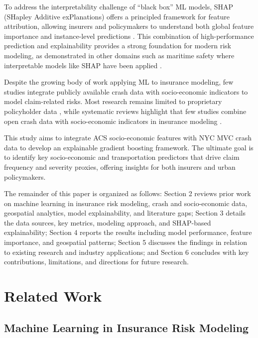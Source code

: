 \documentclass[
  number,
  review,
  3p]{elsarticle}
\begin{document}
To address the interpretability challenge of ``black box'' ML models,
SHAP (SHapley Additive exPlanations) offers a principled framework for
feature attribution, allowing insurers and policymakers to understand
both global feature importance and instance-level predictions
\citep{lundberg, dong, ning}. This combination of high-performance
prediction and explainability provides a strong foundation for modern
risk modeling, as demonstrated in other domains such as maritime safety
where interpretable models like SHAP have been applied \citep{kim}.

Despite the growing body of work applying ML to insurance modeling, few
studies integrate publicly available crash data with socio-economic
indicators to model claim-related risks. Most research remains limited
to proprietary policyholder data \citep{henckaerts, mohamed}, while
systematic reviews highlight that few studies combine open crash data
with socio-economic indicators in insurance modeling
\citep{ali, behboudi}.

This study aims to integrate ACS socio-economic features with NYC MVC
crash data to develop an explainable gradient boosting framework. The
ultimate goal is to identify key socio-economic and transportation
predictors that drive claim frequency and severity proxies, offering
insights for both insurers and urban policymakers.

The remainder of this paper is organized as follows: Section 2 reviews
prior work on machine learning in insurance risk modeling, crash and
socio-economic data, geospatial analytics, model explainability, and
literature gaps; Section 3 details the data sources, key metrics,
modeling approach, and SHAP-based explainability; Section 4 reports the
results including model performance, feature importance, and geospatial
patterns; Section 5 discusses the findings in relation to existing
research and industry applications; and Section 6 concludes with key
contributions, limitations, and directions for future research.

\section{Related Work}\label{related-work}

\subsection{\texorpdfstring{\textbf{Machine Learning in Insurance Risk
Modeling}}{Machine Learning in Insurance Risk Modeling}}\label{machine-learning-in-insurance-risk-modeling}
\end{document}
